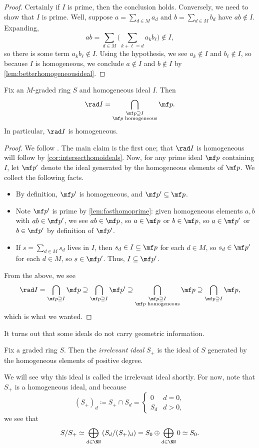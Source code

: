 \documentclass[../notes.tex]{subfiles}
\begin{document}
\begin{proof}
	Certainly if $I$ is prime, then the conclusion holds. Conversely, we need to show that $I$ is prime. Well, suppose $a=\sum_{d\in M}a_d$ and $b=\sum_{d\in M}b_d$ have $ab\notin I$. Expanding,
	\[ab=\sum_{d\in M}\Bigg(\sum_{k+\ell=d}a_kb_\ell\Bigg)\notin I,\]
	so there is some term $a_kb_\ell\notin I$. Using the hypothesis, we see $a_k\notin I$ and $b_\ell\notin I$, so because $I$ is homogeneous, we conclude $a\notin I$ and $b\notin I$ by \autoref{lem:betterhomogeneousideal}.
\end{proof}
\begin{lemma} \label{lem:radhomo}
	Fix an $M$-graded ring $S$ and homogeneous ideal $I$. Then
	\[\rad I=\bigcap_{\substack{\mf p\supseteq I\\\mf p\text{ homogeneous}}}\mf p.\]
	In particular, $\rad I$ is homogeneous.
\end{lemma}
\begin{proof}
	We follow \cite{ms-238203}. The main claim is the first one; that $\rad I$ is homogeneous will follow by \autoref{cor:intersecthomoideals}. Now, for any prime ideal $\mf p$ containing $I$, let $\mf p'$ denote the ideal generated by the homogeneous elements of $\mf p$. We collect the following facts.
	\begin{itemize}
		\item By definition, $\mf p'$ is homogeneous, and $\mf p'\subseteq\mf p$.
		\item Note $\mf p'$ is prime by \autoref{lem:fasthomoprime}: given homogeneous elements $a,b$ with $ab\in\mf p'$, we see $ab\in\mf p$, so $a\in\mf p$ or $b\in\mf p$, so $a\in\mf p'$ or $b\in\mf p'$ by definition of $\mf p'$.
		\item If $s=\sum_{d\in M}s_d$ lives in $I$, then $s_d\in I\subseteq\mf p$ for each $d\in M$, so $s_d\in\mf p'$ for each $d\in M$, so $s\in\mf p'$. Thus, $I\subseteq\mf p'$.
	\end{itemize}
	From the above, we see
	\[\rad I=\bigcap_{\mf p\supseteq I}\mf p\supseteq\bigcap_{\mf p\supseteq I}\mf p'\supseteq\bigcap_{\substack{\mf p\supseteq I\\\mf p\text{ homogeneous}}}\mf p\supseteq\bigcap_{\mf p\supseteq I}\mf p,\]
	which is what we wanted.
\end{proof}
It turns out that some ideals do not carry geometric information.
\begin{definition}
	Fix a graded ring $S$. Then the \textit{irrelevant ideal} $S_+$ is the ideal of $S$ generated by the homogeneous elements of positive degree.
\end{definition}
We will see why this ideal is called the irrelevant ideal shortly. For now, note that $S_+$ is a homogeneous ideal, and because
\[(S_+)_d\coloneqq S_+\cap S_d=\begin{cases}
	0 & d=0, \\
	S_d & d>0,
\end{cases}\]
we see that
\[S/S_+\simeq\bigoplus_{d\in\NN}\left(S_d/(S_+)_d\right)=S_0\oplus\bigoplus_{d\in\NN}0\simeq S_0.\]
\end{document}

